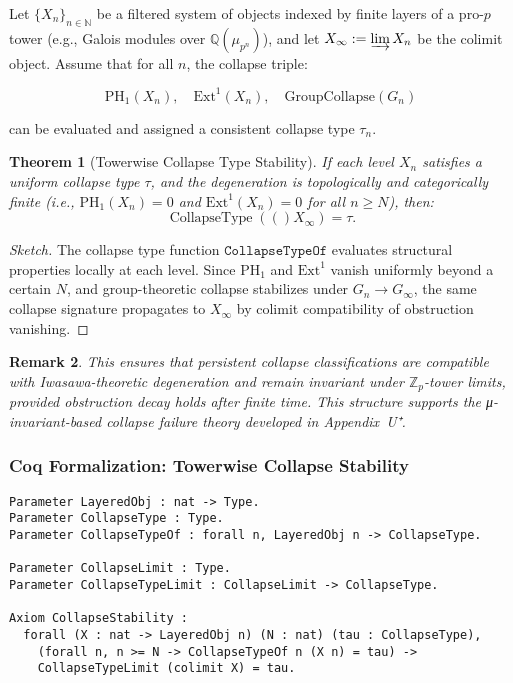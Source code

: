 \documentclass[11pt]{article}
\newtheorem{theorem}{Theorem}[section]
\newtheorem{remark}[theorem]{Remark}
\newcommand{\CollapseTypeOf}[1]{\operatorname{CollapseType}(#1)}
\begin{document}
Let $\{ X_n \}_{n \in \mathbb{N}}$ be a filtered system of objects indexed by finite layers of a pro-$p$ tower (e.g., Galois modules over $\mathbb{Q}(\mu_{p^n})$), and let $X_\infty := \varinjlim X_n$ be the colimit object. Assume that for all $n$, the collapse triple:

\[
\mathrm{PH}_1(X_n),\quad \mathrm{Ext}^1(X_n),\quad \mathrm{GroupCollapse}(G_n)
\]

can be evaluated and assigned a consistent collapse type $\tau_n$.

\begin{theorem}[Towerwise Collapse Type Stability]
If each level $X_n$ satisfies a uniform collapse type $\tau$, and the degeneration is topologically and categorically finite (i.e., $\mathrm{PH}_1(X_n) = 0$ and $\mathrm{Ext}^1(X_n) = 0$ for all $n \geq N$), then:
\[
\textstyle \CollapseTypeOf(X_\infty) = \tau.
\]
\end{theorem}

\begin{proof}[Sketch]
The collapse type function $\texttt{CollapseTypeOf}$ evaluates structural properties locally at each level. Since $\mathrm{PH}_1$ and $\mathrm{Ext}^1$ vanish uniformly beyond a certain $N$, and group-theoretic collapse stabilizes under $G_n \to G_\infty$, the same collapse signature propagates to $X_\infty$ by colimit compatibility of obstruction vanishing.
\end{proof}

\begin{remark}
This ensures that persistent collapse classifications are compatible with Iwasawa-theoretic degeneration and remain invariant under $\mathbb{Z}_p$-tower limits, provided obstruction decay holds after finite time. This structure supports the μ-invariant-based collapse failure theory developed in Appendix~U⁺.
\end{remark}

\subsubsection*{Coq Formalization: Towerwise Collapse Stability}

\begin{lstlisting}[language=Coq, caption=Towerwise Collapse Type Stability in Coq]
Parameter LayeredObj : nat -> Type.
Parameter CollapseType : Type.
Parameter CollapseTypeOf : forall n, LayeredObj n -> CollapseType.

Parameter CollapseLimit : Type.
Parameter CollapseTypeLimit : CollapseLimit -> CollapseType.

Axiom CollapseStability :
  forall (X : nat -> LayeredObj n) (N : nat) (tau : CollapseType),
    (forall n, n >= N -> CollapseTypeOf n (X n) = tau) ->
    CollapseTypeLimit (colimit X) = tau.
\end{lstlisting}
\end{document}
